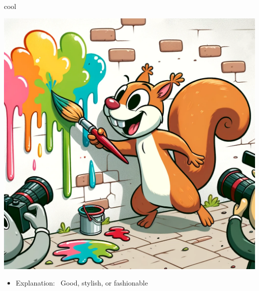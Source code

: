 \documentclass[avery5371, grid,frame]{flashcards}
\begin{document}
\renewcommand{\cardpaper}{a4paper}
\renewcommand{\cardpapermode}{landscape}
\renewcommand{\cardrows}{2}
\renewcommand{\cardcolumns}{2}
\setlength{\cardheight}{3.5in}
\setlength{\cardwidth}{5.0in}
\setlength{\topoffset}{0.65in}
\setlength{\oddoffset}{0.65in}
\setlength{\evenoffset}{0.65in}

\begin{flashcard}{cool}
    \vspace*{\fill}
    \begin{center}
        \begin{minipage}[c]{.45\textwidth}
            \includegraphics[width=\textwidth]{cards/c/cool/cool - a squirrel with a paintbrush, painting graffiti art on a wall, with other animals taking photos.png}
        \end{minipage}
        \begin{minipage}[c]{.45\textwidth}
            \begin{itemize}\setlength\itemsep{12pt}
            \item Explanation: \ Good, stylish, or fashionable


\end{itemize}
\end{minipage}
\end{center}
\end{flashcard}
\end{document}
